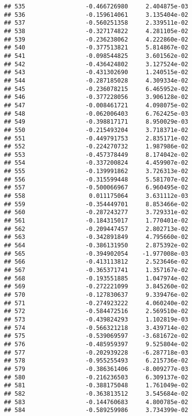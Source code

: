 \documentclass[
]{article}
\begin{document}
\begin{verbatim}
## 535                 -0.466726980     2.404875e-03
## 536                 -0.159614061     3.135404e-02
## 537                 -0.560251358     2.339511e-02
## 538                 -0.327174822     4.281105e-02
## 539                 -0.236238062     4.222860e-02
## 540                 -0.377513821     5.814867e-02
## 541                 -0.098544825     3.601562e-02
## 542                 -0.436424802     3.127524e-02
## 543                 -0.431302690     1.240515e-02
## 544                 -0.287185028     4.309334e-02
## 545                 -0.236078215     6.465952e-02
## 546                 -0.377228056     3.906128e-02
## 547                 -0.008461721     4.098075e-02
## 548                 -0.062006403     6.762425e-03
## 549                 -0.398817171     8.950029e-03
## 550                 -0.215493204     3.718371e-02
## 551                 -0.449791753     2.835171e-02
## 552                 -0.224270732     1.987986e-02
## 553                 -0.457378449     8.174042e-02
## 554                 -0.337200824     4.459907e-02
## 555                 -0.139991862     3.726313e-02
## 556                 -0.315599448     5.581707e-02
## 557                 -0.500066967     6.960495e-02
## 558                  0.011175064     3.631112e-03
## 559                 -0.354449701     8.853466e-02
## 560                 -0.287243277     3.729331e-02
## 561                 -0.184315017     1.770401e-02
## 562                 -0.209447457     2.802713e-02
## 563                 -0.342891849     4.795660e-02
## 564                 -0.386131950     2.875392e-02
## 565                 -0.394902054    -1.977008e-03
## 566                 -0.413113812     2.523646e-02
## 567                 -0.365371741     1.357167e-02
## 568                 -0.193551885     1.047974e-02
## 569                 -0.272221099     3.845260e-02
## 570                 -0.127830637     9.339476e-02
## 571                 -0.274923222     4.060240e-02
## 572                 -0.584472516     2.569510e-02
## 573                 -0.439824293     1.102819e-03
## 574                 -0.566321218     3.439714e-02
## 575                 -0.539069597    -3.681672e-02
## 576                 -0.485959397     9.525804e-02
## 577                 -0.202939228    -6.287718e-03
## 578                 -0.955255493     6.215736e-02
## 579                 -0.386361406    -8.009277e-03
## 580                 -0.216236503     6.309137e-02
## 581                 -0.388175048     1.761049e-02
## 582                 -0.363813512     3.545684e-02
## 583                 -0.144760683     4.800785e-02
## 584                 -0.589259986     3.734399e-02

\end{verbatim}
\end{document}
